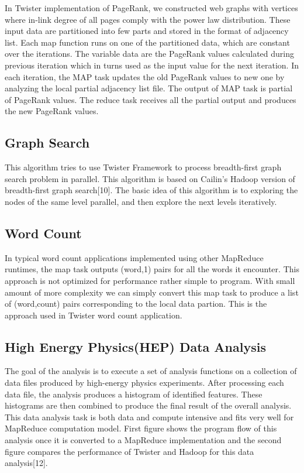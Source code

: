 \documentclass[9pt,twocolumn,twoside]{styles/osajnl}
\begin{document}
In Twister implementation of PageRank, we constructed web graphs with
vertices where in-link degree of all pages comply with the power law
distribution. These input data are partitioned into few parts and
stored in the format of adjacency list. Each map function runs on one
of the partitioned data, which are constant over the iterations. The
variable data are the PageRank values calculated during previous
iteration which in turns used as the input value for the next
iteration. In each iteration, the MAP task updates the old PageRank
values to new one by analyzing the local partial adjacency list
file. The output of MAP task is partial of PageRank values. The reduce
task receives all the partial output and produces the new PageRank
values\cite{twister}.


\subsection{Graph Search}
This algorithm tries to use Twister Framework to process breadth-first
graph search problem in parallel. This algorithm is based on Cailin's
Hadoop version of breadth-first graph search[10]. The basic idea of
this algorithm is to exploring the nodes of the same level parallel,
and then explore the next levels iteratively\cite{twister}.


\subsection{Word Count}

In typical word count applications implemented using other MapReduce
runtimes, the map task outputs (word,1) pairs for all the words it
encounter. This approach is not optimized for performance rather
simple to program. With small amount of more complexity we can simply
convert this map task to produce a list of (word,count) pairs
corresponding to the local data partion. This is the approach used in
Twister word count application\cite{twister}.


\subsection{High Energy Physics(HEP) Data Analysis}

The goal of the analysis is to execute a set of analysis functions on
a collection of data files produced by high-energy physics
experiments. After processing each data file, the analysis produces a
histogram of identified features. These histograms are then combined
to produce the final result of the overall analysis. This data
analysis task is both data and compute intensive and fits very well
for MapReduce computation model. First figure shows the program flow
of this analysis once it is converted to a MapReduce implementation
and the second figure compares the performance of Twister and Hadoop
for this data analysis[12]\cite{twister}.
\end{document}

